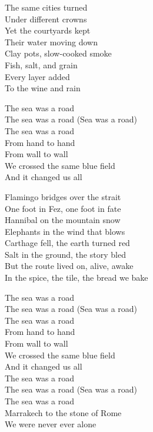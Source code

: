 \begin{lyrics}
The same cities turned\\
Under different crowns\\
Yet the courtyards kept\\
Their water moving down\\
Clay pots, slow-cooked smoke\\
Fish, salt, and grain\\
Every layer added\\
To the wine and rain

The sea was a road\\
The sea was a road
(Sea was a road)\\
The sea was a road\\
From hand to hand\\
From wall to wall\\
We crossed the same blue field\\
And it changed us all

Flamingo bridges over the strait\\
One foot in Fez, one foot in fate\\
Hannibal on the mountain snow\\
Elephants in the wind that blows\\
Carthage fell, the earth turned red\\
Salt in the ground, the story bled\\
But the route lived on, alive, awake\\
In the spice, the tile, the bread we bake

The sea was a road\\
The sea was a road
(Sea was a road)\\
The sea was a road\\
From hand to hand\\
From wall to wall\\
We crossed the same blue field\\
And it changed us all\\
The sea was a road\\
The sea was a road
(Sea was a road)\\
The sea was a road\\
Marrakech to the stone of Rome\\
We were never ever alone
\end{lyrics}

